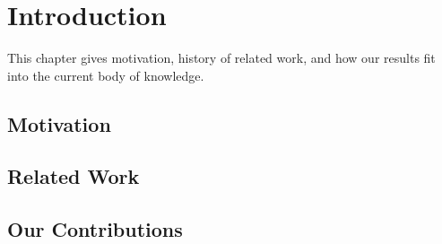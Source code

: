 \chapter{Introduction}
This chapter gives motivation, history of related work, and how our results fit into the current body of knowledge.

\section{Motivation}





\section{Related Work}





\section{Our Contributions}



